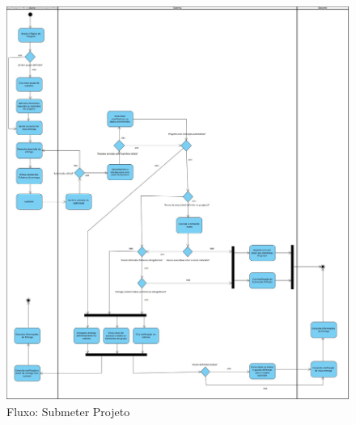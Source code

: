 \begin{figure}[H] 
  \centering
  \includegraphics[width=1\textwidth,center]{images/arquitetura/submissao-projecto}
  \caption{Fluxo: Submeter Projeto}
  \label{fig:submissao-projecto}
\end{figure}
